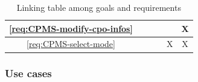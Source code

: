 \begin{table}[h]
\begin{center}
\begin{tabular}{|c||c|c|c|c|c|}
            \ref{req:CPMS-modify-cpo-infos}      &                                 &                                &                              &                                & X                              \\\hline
            \ref{req:CPMS-select-mode}           &                                 &                                &                              & X                              & X                              \\\hline
        \end{tabular}
    \end{center}
    \caption{Linking table among goals and requirements}
\end{table}

\clearpage
\subsubsection{Use cases}


